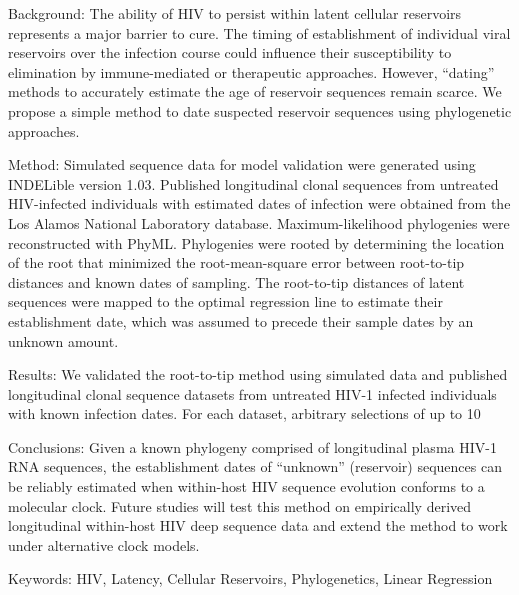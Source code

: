 Background: The ability of HIV to persist within latent cellular reservoirs represents a major barrier to cure. The timing of establishment of individual viral reservoirs over the infection course could influence their susceptibility to elimination by immune-mediated or therapeutic approaches. However, “dating” methods to accurately estimate the age of reservoir sequences remain scarce. We propose a simple method to date suspected reservoir sequences using phylogenetic approaches. 

Method: Simulated sequence data for model validation were generated using INDELible version 1.03.  Published longitudinal clonal sequences from untreated HIV-infected individuals with estimated dates of infection were obtained from the Los Alamos National Laboratory database. Maximum-likelihood phylogenies were reconstructed with PhyML. Phylogenies were rooted by determining the location of the root that minimized the root-mean-square error between root-to-tip distances and known dates of sampling. The root-to-tip distances of latent sequences were mapped to the optimal regression line to estimate their establishment date, which was assumed to precede their sample dates by an unknown amount.
 
Results: We validated the root-to-tip method using simulated data and published longitudinal clonal sequence datasets from untreated HIV-1 infected individuals with known infection dates. For each dataset, arbitrary selections of up to 10%

Conclusions:
Given a known phylogeny comprised of longitudinal plasma HIV-1 RNA sequences, the establishment dates of “unknown” (reservoir) sequences can be reliably estimated when within-host HIV sequence evolution conforms to a molecular clock. Future studies will test this method on empirically derived longitudinal within-host HIV deep sequence data and extend the method to work under alternative clock models.

Keywords: 
HIV, Latency, Cellular Reservoirs, Phylogenetics, Linear Regression
